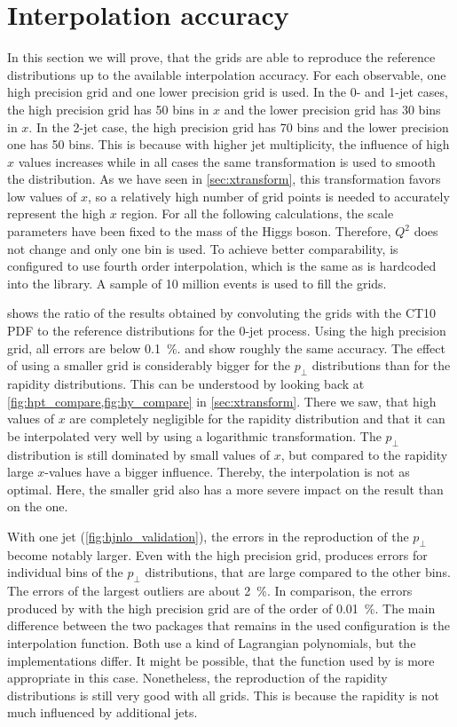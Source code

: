 \section{Interpolation accuracy}
In this section we will prove, that the grids are able to reproduce the reference distributions up to the available interpolation accuracy.
For each observable, one high precision grid and one lower precision grid is used.
In the 0- and 1-jet cases, the high precision grid has \num{50} bins in $x$ and the lower precision grid has \num{30} bins in $x$.
In the 2-jet case, the high precision grid has \num{70} bins and the lower precision one has \num{50} bins.
This is because with higher jet multiplicity, the influence of high $x$ values increases while in all cases the same transformation is used to smooth the distribution.
As we have seen in \cref{sec:xtransform}, this transformation favors low values of $x$, so a relatively high number of grid points is needed to accurately represent the high $x$ region.
For all the following calculations, the scale parameters have been fixed to the mass of the Higgs boson.
Therefore, $Q^2$ does not change and only one bin is used.
To achieve better comparability, \appl{} is configured to use fourth order interpolation, which is the same as is hardcoded into the \fnlo{} library.
A sample of \num{10} million events is used to fill the grids.

 shows the ratio of the results obtained by convoluting the grids with the CT10 PDF to the reference distributions for the 0-jet process.
Using the high precision grid, all errors are below \SI{0.1}{\percent}.
\appl{} and \fnlo{} show roughly the same accuracy.
The effect of using a smaller grid is considerably bigger for the $p_\perp$ distributions than for the rapidity distributions.
This can be understood by looking back at \cref{fig:hpt_compare,fig:hy_compare} in \cref{sec:xtransform}.
There we saw, that high values of $x$ are completely negligible for the rapidity distribution and that it can be interpolated very well by using a logarithmic transformation.
The $p_\perp$ distribution is still dominated by small values of $x$, but compared to the rapidity large $x$-values have a bigger influence.
Thereby, the interpolation is not as optimal.
Here, the smaller grid also has a more severe impact on the \appl{} result than on the \fnlo{} one.

With one jet (\cref{fig:hjnlo_validation}), the errors in the reproduction of the $p_\perp$ become notably larger.
Even with the high precision grid, \fnlo{} produces errors for individual bins of the $p_\perp$ distributions, that are large compared to the other bins.
The errors of the largest outliers are about \SI{2}{\percent}.
In comparison, the errors produced by \appl{} with the high precision grid are of the order of \SI{0.01}{\percent}.
The main difference between the two packages that remains in the used configuration is the interpolation function.
Both use a kind of Lagrangian polynomials, but the implementations differ.
It might be possible, that the function used by \appl{} is more appropriate in this case.
Nonetheless, the reproduction of the rapidity distributions is still very good with all grids.
This is because the rapidity is not much influenced by additional jets.

